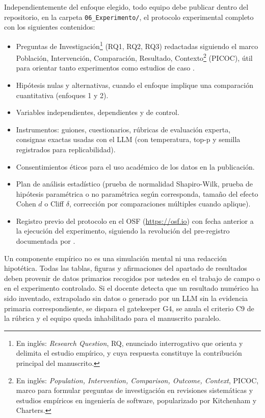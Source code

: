 \documentclass[11pt,a4paper]{article}
\begin{document}
\begin{notabox}[title=Elementos comunes a los tres enfoques que deben incluirse en el protocolo experimental]
Independientemente del enfoque elegido, todo equipo debe publicar dentro del repositorio, en la carpeta \texttt{06\_Experimento/}, el protocolo experimental completo con los siguientes contenidos:
\begin{itemize}
    \item Preguntas de Investigación\footnote{En inglés: \emph{Research Question}, RQ, enunciado interrogativo que orienta y delimita el estudio empírico, y cuya respuesta constituye la contribución principal del manuscrito.} (RQ1, RQ2, RQ3) redactadas siguiendo el marco Población, Intervención, Comparación, Resultado, Contexto\footnote{En inglés: \emph{Population, Intervention, Comparison, Outcome, Context}, PICOC, marco para formular preguntas de investigación en revisiones sistemáticas y estudios empíricos en ingeniería de software, popularizado por Kitchenham y Charters.} (PICOC), útil para orientar tanto experimentos como estudios de caso \cite{kitchenham2007guidelines}.
    \item Hipótesis nulas y alternativas, cuando el enfoque implique una comparación cuantitativa (enfoques 1 y 2).
    \item Variables independientes, dependientes y de control.
    \item Instrumentos: guiones, cuestionarios, rúbricas de evaluación experta, consignas exactas usadas con el LLM (con temperatura, top-p y semilla registrados para replicabilidad).
    \item Consentimientos éticos para el uso académico de los datos en la publicación.
    \item Plan de análisis estadístico (prueba de normalidad Shapiro-Wilk, prueba de hipótesis paramétrica o no paramétrica según corresponda, tamaño del efecto Cohen $d$ o Cliff $\delta$, corrección por comparaciones múltiples cuando aplique).
    \item Registro previo del protocolo en el OSF (\url{https://osf.io}) con fecha anterior a la ejecución del experimento, siguiendo la revolución del pre-registro documentada por \cite{nosek2018preregistration}.
\end{itemize}
\end{notabox}

\begin{alertbox}[title=Advertencia específica para el componente empírico]
Un componente empírico no es una simulación mental ni una redacción hipotética. Todas las tablas, figuras y afirmaciones del apartado de resultados deben provenir de datos primarios recogidos por ustedes en el trabajo de campo o en el experimento controlado. Si el docente detecta que un resultado numérico ha sido inventado, extrapolado sin datos o generado por un LLM sin la evidencia primaria correspondiente, se dispara el gatekeeper G4, se anula el criterio C9 de la rúbrica y el equipo queda inhabilitado para el manuscrito paralelo.
\end{alertbox}
\end{document}
